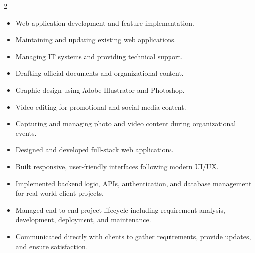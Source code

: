 \documentclass[10pt,a4paper,ragged2e,withhyper]{files/altacv}
\begin{document}
\vspace{4mm}
\makecvheader
\divider
{}

\begin{paracol}{2}

    \begin{itemize}
        \item Web application development and feature implementation.
        \item Maintaining and updating existing web applications.
        \item Managing IT systems and providing technical support.
        \item Drafting official documents and organizational content.
        \item Graphic design using Adobe Illustrator and Photoshop.
        \item Video editing for promotional and social media content.
        \item Capturing and managing photo and video content during organizational events.
    \end{itemize}

    \divider

    \begin{itemize}
        \item Designed and developed full-stack web applications.
        \item Built responsive, user-friendly interfaces following modern UI/UX.
        \item Implemented backend logic, APIs, authentication, and database management for real-world client projects.
        \item Managed end-to-end project lifecycle including requirement analysis, development, deployment, and maintenance.
        \item Communicated directly with clients to gather requirements, provide updates, and ensure satisfaction.
    \end{itemize}
    \vspace{4mm}


\end{paracol}
\end{document}
